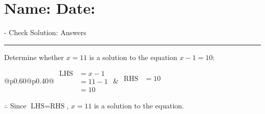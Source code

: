 \documentclass[12pt]{article}
\def \HeadingAnswers {\section*{\Large Name: \underline{\hspace{8cm}} \hfill Date: \underline{\hspace{3cm}}} \vspace{-3mm}
{- Check Solution: Answers} \vspace{1pt}\hrule}
\newcounter{minipagecount}
\begin{document}
\HeadingAnswers
\vspace{1pt}
\begin{multicols}{2}
\noindent{(\theminipagecount)}\hspace{0.1mm} %
\begin{minipage}[t]{0.40\textwidth} %

    \noindent Determine whether \(x = 11\) is a solution to the equation \(x - 1 = 10\):
    \vspace{4pt}  %

    \noindent
    \renewcommand{\arraystretch}{1.3} %
    \begin{tabular}{@{}p{0.60\linewidth}@{}p{0.40\linewidth}@{}}
        \(\begin{aligned}
            \text{LHS} &= x - 1 \\
                    &= 11 - 1 \\
                    &= 10
        \end{aligned}\) &
        \(\begin{aligned}
            \text{RHS} &= 10\\
                    & \\
                    &
        \end{aligned}\)
    \end{tabular}
    \renewcommand{\arraystretch}{1.0} %
    \vspace{2pt}  %

    \noindent \(\therefore\) Since \(\text{LHS} = \text{RHS}\), \(x = 11\) is  a solution to the equation.

\end{minipage}

 \vspace*{16pt}
\noindent{(\theminipagecount)}\hspace{0.1mm} %
\begin{minipage}[t]{0.40\textwidth} %


\end{minipage}
\end{multicols}
\end{document}
